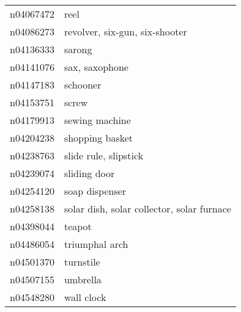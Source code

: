 \begin{appendices}
\begin{longtabu}{X|X[4]}
    		n04067472 &                                                                                                                       reel \tabularnewline
    		n04086273 &                                                                                             revolver, six-gun, six-shooter \tabularnewline
    		n04136333 &                                                                                                                     sarong \tabularnewline
    		n04141076 &                                                                                                             sax, saxophone \tabularnewline
    		n04147183 &                                                                                                                   schooner \tabularnewline
    		n04153751 &                                                                                                                      screw \tabularnewline
    		n04179913 &                                                                                                             sewing machine \tabularnewline
    		n04204238 &                                                                                                            shopping basket \tabularnewline
    		n04238763 &                                                                                                      slide rule, slipstick \tabularnewline
    		n04239074 &                                                                                                               sliding door \tabularnewline
    		n04254120 &                                                                                                             soap dispenser \tabularnewline
    		n04258138 &                                                                                 solar dish, solar collector, solar furnace \tabularnewline
    		n04398044 &                                                                                                                     teapot \tabularnewline
    		n04486054 &                                                                                                             triumphal arch \tabularnewline
    		n04501370 &                                                                                                                  turnstile \tabularnewline
    		n04507155 &                                                                                                                   umbrella \tabularnewline
    		n04548280 &                                                                                                                 wall clock \tabularnewline

\end{longtabu}
\end{appendices}
